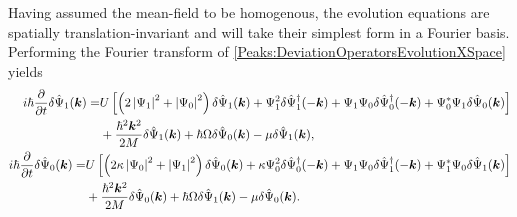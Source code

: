 Having assumed the mean-field to be homogenous, the evolution equations are spatially translation-invariant and will take their simplest form in a Fourier basis. Performing the Fourier transform of \eqref{Peaks:DeviationOperatorsEvolutionXSpace} yields
\begin{subequations}
    \label{Peaks:DeviationOperatorsEvolutionKSpace}
    \begin{align}
        \begin{split}
            i \hbar \frac{\partial }{\partial t}\delta \hat{\Psi}_1(\bm{k}) =& U\left[ \left(2\abs{\Psi_1}^2+\abs{\Psi_0}^2 \right)\delta \hat{\Psi}_1(\bm{k}) + \Psi_1^2\delta\hat{\Psi}_1^\dagger(-\bm{k}) + \Psi_1\Psi_0\delta\hat{\Psi}_0^\dagger(-\bm{k}) + \Psi_0^*\Psi_1\delta\hat{\Psi}_0(\bm{k})\right]\\
                    & +\frac{\hbar^2 \bm{k}^2}{2M} \delta \hat{\Psi}_1(\bm{k}) +\hbar \Omega\delta\hat{\Psi}_0(\bm{k})- \mu \delta \hat{\Psi}_1(\bm{k}),
        \end{split}\\
        \begin{split}
        i \hbar \frac{\partial}{\partial t} \delta \hat{\Psi}_0(\bm{k}) =& U\left[\left(2\kappa \abs{\Psi_0}^2 +\abs{\Psi_1}^2\right)\delta\hat{\Psi}_0(\bm{k}) + \kappa \Psi_0^2 \delta\hat{\Psi}_0^\dagger(-\bm{k}) + \Psi_1\Psi_0\delta\hat{\Psi}_1^\dagger(-\bm{k}) + \Psi_1^*\Psi_0\delta\hat{\Psi}_1(\bm{k})\right]\\
                    & +\frac{\hbar^2 \bm{k}^2}{2M} \delta \hat{\Psi}_0(\bm{k}) +\hbar \Omega\delta\hat{\Psi}_1(\bm{k}) - \mu \delta\hat{\Psi}_0(\bm{k}).
        \end{split}
    \end{align}
\end{subequations}

